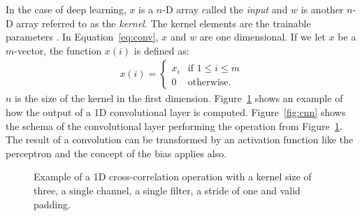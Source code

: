 \documentclass[]{article}
\begin{document}
In the case of deep learning, $x$ is a $n$-D array called the
\textit{input} and $w$ is another $n$-D array referred to as the
\textit{kernel}. The kernel elements are the trainable parameters
\citep{goodfellow_et_al_2016}.
In Equation~\ref{eq:conv}, $x$ and $w$ are one dimensional.
If we let $x$ be a $m$-vector, the function $x(i)$ is defined as:
\begin{align}
  \label{eq:valid_conv}
  x(i) = \begin{cases}
    x_i &\text{if } 1 \leq i \leq m \\
    0 &\text{otherwise.}
  \end{cases}
\end{align}
$n$ is the size of the kernel in the first dimension.
Figure~\ref{fig:conv_op} shows an example of how the output of a
1D convolutional layer is computed.
Figure~\ref{fig:cnn} shows the schema of the convolutional
layer performing the operation from Figure~\ref{fig:conv_op}.
The result of a convolution can be transformed by an activation
function like the perceptron and the concept of the bias applies also.

\begin{figure} %
\begin{center}
\end{center}
\caption{Example of a 1D cross-correlation operation with a kernel
  size of three, a single channel, a single filter, a stride of one
  and valid padding.}
\label{fig:conv_op}
\end{figure} %
\end{document}
